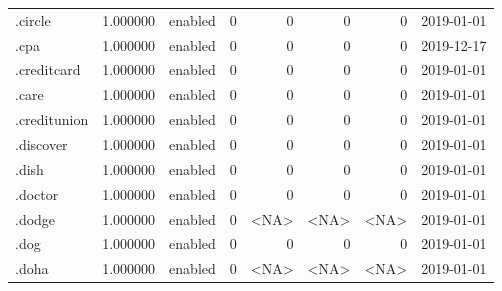 \begin{tabular}{lrlrrrrl}
.circle                   &          1.000000 &         enabled &                           0 &                           0 &                           0 &                   0 &           2019-01-01 \\
.cpa                      &          1.000000 &         enabled &                           0 &                           0 &                           0 &                   0 &           2019-12-17 \\
.creditcard               &          1.000000 &         enabled &                           0 &                           0 &                           0 &                   0 &           2019-01-01 \\
.care                     &          1.000000 &         enabled &                           0 &                           0 &                           0 &                   0 &           2019-01-01 \\
.creditunion              &          1.000000 &         enabled &                           0 &                           0 &                           0 &                   0 &           2019-01-01 \\
.discover                 &          1.000000 &         enabled &                           0 &                           0 &                           0 &                   0 &           2019-01-01 \\
.dish                     &          1.000000 &         enabled &                           0 &                           0 &                           0 &                   0 &           2019-01-01 \\
.doctor                   &          1.000000 &         enabled &                           0 &                           0 &                           0 &                   0 &           2019-01-01 \\
.dodge                    &          1.000000 &         enabled &                           0 &                        <NA> &                        <NA> &                <NA> &           2019-01-01 \\
.dog                      &          1.000000 &         enabled &                           0 &                           0 &                           0 &                   0 &           2019-01-01 \\
.doha                     &          1.000000 &         enabled &                           0 &                        <NA> &                        <NA> &                <NA> &           2019-01-01 \\

\end{tabular}
